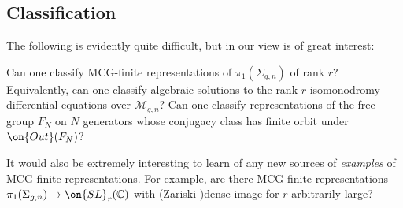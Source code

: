 \subsection{Classification}
The following is evidently quite difficult, but in our view is of great interest:
\begin{question}
\notready
Can one classify MCG-finite representations of $\pi_1(\Sigma_{g,n})$	 of rank $r$? Equivalently, can one classify algebraic solutions to the rank $r$ isomonodromy differential equations over $\mathscr{M}_{g,n}$? Can one classify representations of the free group $F_N$ on $N$ generators whose conjugacy class has finite orbit under $\on{Out}(F_N)$?
\end{question}
\begin{remark}
\notready
	\label{remark:}
It would also be extremely interesting to learn of any new sources of
\emph{examples} of MCG-finite representations. For example, are there MCG-finite representations $\pi_1(\Sigma_{g,n})\to \on{SL}_r(\mathbb{C})$ with (Zariski-)dense image for $r$ arbitrarily large?
\end{remark}


\appendix
